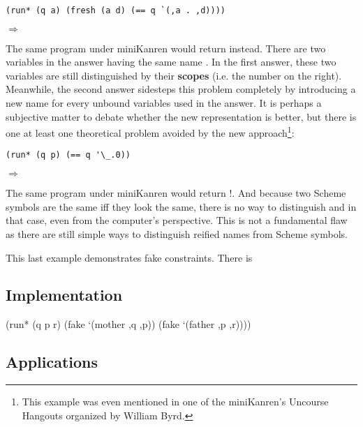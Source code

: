 \begin{lstlisting}
(run* (q a) (fresh (a d) (== q `(,a . ,d))))
\end{lstlisting}
$\Rightarrow$ 

The same program under miniKanren would return  instead. There are two variables in the answer having the same name . In the first answer, these two variables are still distinguished by their \textbf{scopes} (i.e. the number on the right). Meanwhile, the second answer sidesteps this problem completely by introducing a new name for every unbound variables used in the answer. It is perhaps a subjective matter to debate whether the new representation is better, but there is one at least one theoretical problem avoided by the new approach\footnote{This example was even mentioned in one of the miniKanren's Uncourse Hangouts organized by William Byrd.}:

\begin{lstlisting}
(run* (q p) (== q '\_.0))
\end{lstlisting}
$\Rightarrow$ 

The same program under miniKanren would return !. And because two Scheme symbols are the same iff they look the same, there is no way to distinguish  and  in that case, even from the computer's perspective. This is not a fundamental flaw as there are still simple ways to distinguish reified names from Scheme symbols.

This last example demonstrates fake constraints. There is 

\subsection{Implementation}
(run* (q p r) (fake `(mother ,q ,p)) (fake `(father ,p ,r))))

\subsection{Applications}